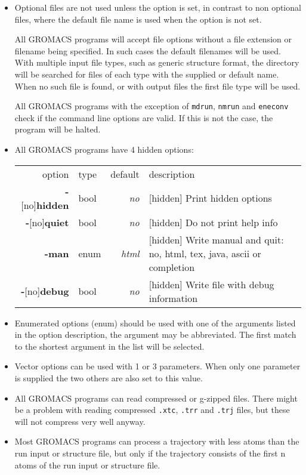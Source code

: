 \begin{itemize}
\item
Optional files are not used unless the option is set, in contrast to
non optional files, where the default file name is used when the
option is not set.

All GROMACS programs will accept file options without a file extension
or filename being specified. In such cases the default filenames will
be used. With multiple input file types, such as generic structure
format, the directory will be searched for files of each type with the
supplied or default name. When no such file is found, or with output
files the first file type will be used.

All GROMACS programs with the exception of {\tt mdrun},
{\tt nmrun} and {\tt eneconv} check if the command line options
are valid. If this is not the case, the program will be halted.

\item
All GROMACS programs have 4 hidden options:\\
\begin{tabularx}{\linewidth}{rlrX}
                option & type &  default & description \\
{\bf -}[no]{\bf hidden}& bool &  {\em no}& [hidden] Print hidden options \\
 {\bf -}[no]{\bf quiet}& bool &  {\em no}& [hidden] Do not print help info \\
             {\bf -man}& enum &{\em html}& [hidden] Write manual and quit: no, html, tex, java, ascii or completion \\
 {\bf -}[no]{\bf debug}& bool &  {\em no}& [hidden] Write file with debug information \\
\end{tabularx}

\item
Enumerated options (enum) should be used with one of the arguments
listed in the option description, the argument may be abbreviated.
The first match to the shortest argument in the list will be selected.

\item
Vector options can be used with 1 or 3 parameters. When only one
parameter is supplied the two others are also set to this value.

\item
All GROMACS programs can read compressed or g-zipped files. There
might be a problem with reading compressed {\tt .xtc},
{\tt .trr} and {\tt .trj} files, but these will not compress
very well anyway.

\item
Most GROMACS programs can process a trajectory with less atoms than
the run input or structure file, but only if the trajectory consists
of the first n atoms of the run input or structure file.
\end{itemize}

\section{}

